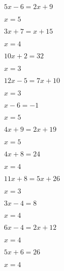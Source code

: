 \documentclass{ximera}
\begin{document}
\begin{exercise}
\begin{xmmulticols}
    \begin{question} \( 5x - 6  = 2x + 9   \) \begin{oplossing} \( x  = 5  \) \end{oplossing} \end{question} 
    \begin{question} \( 3x + 7  = x + 15   \) \begin{oplossing} \( x  = 4  \) \end{oplossing} \end{question} 
    \begin{question} \( 10x + 2 = 32       \) \begin{oplossing} \( x  = 3  \) \end{oplossing} \end{question}
    \begin{question} \( 12x - 5 = 7x + 10  \) \begin{oplossing} \( x  = 3  \) \end{oplossing} \end{question} 
    \begin{question} \( x - 6   = -1       \) \begin{oplossing} \( x  = 5  \) \end{oplossing} \end{question}
    \begin{question} \( 4x + 9  = 2x + 19  \) \begin{oplossing} \( x  = 5  \) \end{oplossing} \end{question} 
    \begin{question} \( 4x + 8  = 24       \) \begin{oplossing} \( x  = 4  \) \end{oplossing} \end{question}
    \begin{question} \( 11x + 8 = 5x + 26  \) \begin{oplossing} \( x  = 3  \) \end{oplossing} \end{question} 
    \begin{question} \( 3x - 4  = 8        \) \begin{oplossing} \( x  = 4  \) \end{oplossing} \end{question}
    \begin{question} \( 6x - 4  = 2x + 12  \) \begin{oplossing} \( x  = 4  \) \end{oplossing} \end{question} 
    \begin{question} \( 5x + 6  = 26       \) \begin{oplossing} \( x  = 4  \) \end{oplossing} \end{question}
    
  \end{xmmulticols}
\end{exercise}
\end{document}
